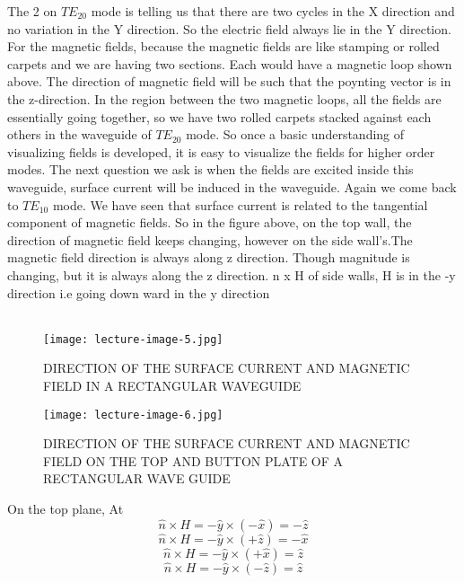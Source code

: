	The 2 on $TE_{20}$ mode is telling us that there are two cycles in the X direction and no variation in the Y direction. So the electric field always lie in the Y direction. For the magnetic fields, because the magnetic fields are like stamping or rolled carpets and we are having two sections. Each would have a magnetic loop shown above. The direction of magnetic field will be such that the poynting vector is in the z-direction. In the region between the two magnetic loops, all the fields are essentially going together, so we have two rolled carpets stacked against each others in the waveguide of $TE_{20}$ mode. So once a basic understanding of visualizing fields is developed, it is easy to visualize the fields for higher order modes. The next question we ask is when the fields are excited inside this waveguide, surface current will be induced in the waveguide. Again we come back to $TE_{10}$ mode. We have seen that surface current is related to the tangential component of magnetic fields. So in the figure above, on the top wall, the direction of magnetic field keeps changing, however on the side wall's.The magnetic field direction is always along z direction. Though magnitude is changing, but it is always along the z direction. n x H of side walls, H is in the -y direction i.e going down ward in the y direction\\\\
	
	\begin{figure}[H]
		\centering
		\texttt{[image: lecture-image-5.jpg]}
		\caption{DIRECTION OF THE SURFACE CURRENT AND MAGNETIC FIELD IN A RECTANGULAR WAVEGUIDE}
	\end{figure}
	
\begin{figure}[H]
	\centering
	\texttt{[image: lecture-image-6.jpg]}
	\caption{DIRECTION OF THE SURFACE CURRENT AND MAGNETIC FIELD ON THE TOP AND BUTTON PLATE OF A RECTANGULAR WAVE GUIDE}
\end{figure}
	
	On the top plane, At\newline
\begin{equation}
   \hat{n} \times H = -\hat{y} \times (-\hat{x})= -\hat{z}
\end{equation}
\begin{equation}
   \hat{n} \times H = -\hat{y} \times (+\hat{z})= -\hat{x}
\end{equation}
\begin{equation}
    \hat{n} \times H = -\hat{y} \times (+\hat{x})= \hat{z}
\end{equation}
\begin{equation}
    \hat{n} \times H = -\hat{y} \times (-\hat{z})= \hat{z}
\end{equation}

